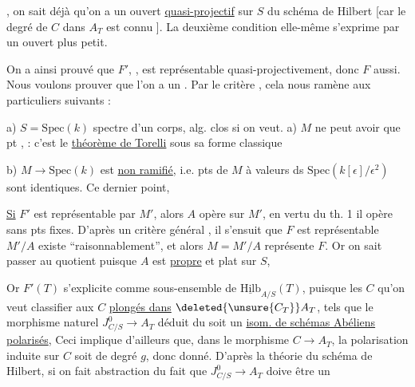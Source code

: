 

, on sait déjà qu'on a  un ouvert \uline{quasi-projectif} sur $S$ du schéma de Hilbert [car le  degré de $C$ dans $A_T$ est connu \unsure{--|- -}].  La deuxième condition elle-même s'exprime par un ouvert plus petit.

On a ainsi prouvé que $F'$, , est représentable quasi-projectivement, donc $F$ aussi. Nous voulons prouver que l'on a un  . Par le critère , cela nous ramène aux  particuliers suivants :

a) $S=\mathrm{Spec}(k)$ spectre d'un corps, alg. clos si on veut. a) \unsure{$\exists$}$M$ ne peut avoir que   pt ,  : c'est le \uline{théorème de Torelli} sous sa forme classique

b)  $M\longrightarrow\mathrm{Spec}(k)$ est \uline{non ramifié}, i.e.   pts de $M$ à valeurs ds $\mathrm{Spec}(k[\epsilon]/\epsilon^2)$   sont identiques.  Ce dernier point,




\uline{Si} $F'$ est représentable par  $M'$, alors $A$ opère sur $M'$, en vertu du th. 1 il opère sans pts fixes.  D'après un critère général , il s'ensuit que $F$ est représentable  $M'/A$ existe ``raisonnablement'', et alors $M=M'/A$ représente $F$. Or on sait passer au quotient puisque $A$ est \uline{propre} et plat sur $S$,

Or $F'(T)$ s'explicite comme sous-ensemble de $\underline{\mathrm{Hilb}}_{A/S}(T)$, puisque les $C$ qu'on veut classifier  aux $C$ \uline{plongés dans} $\deleted{\unsure{C_T}}A_T$, tels que le morphisme naturel $J^0_{C/S}\longrightarrow A_T$ déduit du  soit un \uline{isom. de schémas Abéliens polarisés},   Ceci implique d'ailleurs que, dans le morphisme $C\longrightarrow A_T$,  la polarisation induite sur $C$ soit de degré $g$, donc donné. D'après la théorie du schéma de Hilbert, si on fait abstraction du fait que $J^0_{C/S}\to A_T$ doive être un

